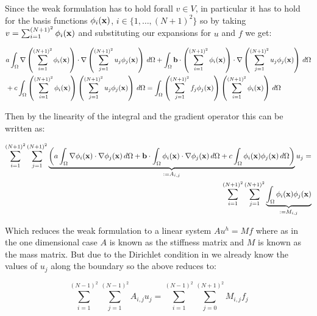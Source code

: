 Since the weak formulation  has to hold
forall $v \in V$, in particular it has to hold for the basis functions
$\phi_i(\mathbf{x})$, $i \in \{1,\ldots,(N + 1)^2\}$ so by taking
$v = \sum_{i = 1}^{(N+1)^2}\phi_i(\mathbf{x})$ and substituting our expansions
for $u$ and $f$ we get:

\begin{align}
\begin{split}
    &a\int_{\Omega}\nabla\left(\sum_{i = 1}^{(N+1)^2}\phi_i(\mathbf{x})\right) \cdot
                  \nabla\left(\sum_{j = 1}^{(N+1)^2}u_j\phi_j(\mathbf{x})\right)\, d\Omega
    +\int_{\Omega}\mathbf{b}\cdot\left(\sum_{i = 1}^{(N+1)^2}\phi_i(\mathbf{x})\right) \cdot
                  \nabla\left(\sum_{j = 1}^{(N+1)^2}u_j\phi_j(\mathbf{x})\right)\, d\Omega \\
    &+c\int_{\Omega}\left(\sum_{i = 1}^{(N + 1)^2}\phi_i(\mathbf{x})\right)
                    \left(\sum_{j = 1}^{(N + 1)^2}u_j\phi_j(\mathbf{x})\right)\, d\Omega =
    \int_{\Omega}\left(\sum_{j = 1}^{(N + 1)^2}f_j\phi_j(\mathbf{x})\right)
                 \left(\sum_{i = 1}^{(N + 1)^2}\phi_i(\mathbf{x})\right)\, d\Omega
\end{split}
\end{align}

Then by the linearity of the integral and the gradient operator this can be
written as:

\begin{align}\label{eq:twod-deterministic-discrete}
  \begin{split}
    \sum_{i=1}^{(N+1)^2}\sum_{j=1}^{(N+1)^2}
      \underbrace{\left(
         a\int_{\Omega}\nabla\phi_i(\mathbf{x})\cdot\nabla\phi_j(\mathbf{x})\, d\Omega
         + \mathbf{b}\cdot\int_{\Omega}\phi_i(\mathbf{x})\cdot\nabla\phi_j(\mathbf{x})\, d\Omega
         +c\int_{\Omega}\phi_i(\mathbf{x})\phi_j(\mathbf{x})\, d\Omega
      \right)}_{:= A_{i,j}}u_j = \\
    \sum_{i=1}^{(N + 1)^2}\sum_{j=1}^{(N + 1)^2}
      \underbrace{\int_{\Omega}\phi_i(\mathbf{x})\phi_j(\mathbf{x})}_{:= M_{i,j}}
  \end{split}
\end{align}

Which reduces the weak formulation  to a linear
system $Au^h = Mf$ where as in the one dimensional case $A$ is known as
the stiffness matrix and $M$ is known as the mass matrix. But due to the Dirichlet
condition in  we already know the values of $u_j$
along the boundary so the above reduces to:

\begin{equation}
    \sum_{i = 1}^{(N-1)^2}\sum_{j=1}^{(N-1)^2}A_{i,j}u_j =
    \sum_{i=1}^{(N-1)^2}\sum_{j=0}^{(N+1)^2}M_{i,j}f_j
\end{equation}

